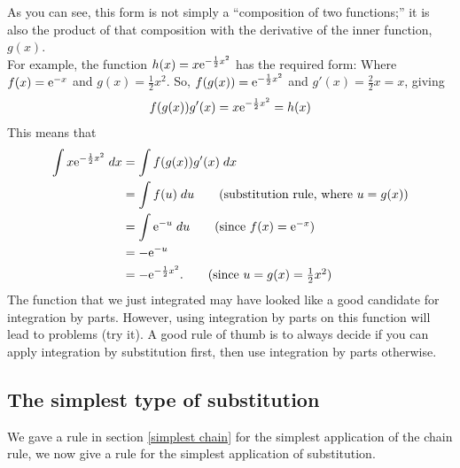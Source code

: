 \noindent As you can see, this form is not simply a ``composition of two functions;'' it is also the product of that composition with the derivative of the inner function, $g(x)$. \\

\noindent For example, the function $h(x) = x\mathrm{e}^{-\frac{1}{2}x^2}$ has the required form: Where $f(x) = \mathrm{e}^{-x}$ and $g(x) = \frac{1}{2}x^2$. So, $f(g(x)) = \mathrm{e}^{-\frac{1}{2}x^2}$ and $g'(x) = \frac{2}{2}x = x$, giving
\[
f(g(x))g'(x) = x\mathrm{e}^{-\frac{1}{2}x^2} = h(x)
\]
This means that
\begin{align*}
\int x\e^{-\frac{1}{2}x^2} \; dx & = \int f(g(x))g'(x) \; dx \\
	& =  \int f(u) \; du   \tag{substitution rule, where $u = g(x)$}\\
	& = \int \e^{-u} \; du \tag{since $f(x) = \e^{-x}$} \\
	& = -\e^{-u} \\
	& = -\e^{-\frac{1}{2}x^2}. \tag{since $u = g(x) = \frac{1}{2}x^2$}
\end{align*}
The function that we just integrated may have looked like a good candidate for integration by parts. However, using integration by parts on this function will lead to problems (try it). A good rule of thumb is to always decide if you can apply integration by substitution first, then use integration by parts otherwise.

\subsection{The simplest type of substitution}
We gave a rule in section \ref{simplest chain} for the simplest application of the chain rule, we now give a rule for the simplest application of substitution. \\

